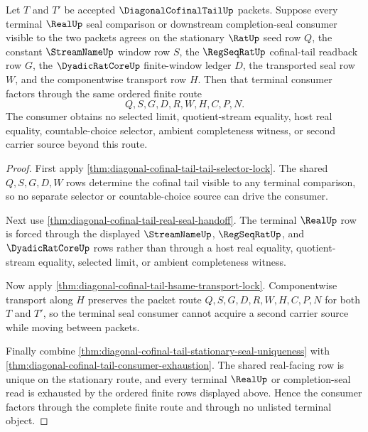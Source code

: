\begin{theorem}
\label{thm:diagonal-cofinal-tail-terminal-seal-factorization}
Let $T$ and $T'$ be accepted $\DiagonalCofinalTailUp$ packets. Suppose every terminal $\RealUp$ seal comparison or downstream completion-seal consumer visible to the two packets agrees on the stationary $\RatUp$ seed row $Q$, the constant $\StreamNameUp$ window row $S$, the $\RegSeqRatUp$ cofinal-tail readback row $G$, the $\DyadicRatCoreUp$ finite-window ledger $D$, the transported seal row $W$, and the componentwise transport row $H$. Then that terminal consumer factors through the same ordered finite route
$$
Q,S,G,D,R,W,H,C,P,N.
$$
The consumer obtains no selected limit, quotient-stream equality, host real equality, countable-choice selector, ambient completeness witness, or second carrier source beyond this route.
\end{theorem}
\begin{proof}
First apply \autoref{thm:diagonal-cofinal-tail-tail-selector-lock}. The shared $Q,S,G,D,W$ rows determine the cofinal tail visible to any terminal comparison, so no separate selector or countable-choice source can drive the consumer.

Next use \autoref{thm:diagonal-cofinal-tail-real-seal-handoff}. The terminal $\RealUp$ row is forced through the displayed $\StreamNameUp$, $\RegSeqRatUp$, and $\DyadicRatCoreUp$ rows rather than through a host real equality, quotient-stream equality, selected limit, or ambient completeness witness.

Now apply \autoref{thm:diagonal-cofinal-tail-hsame-transport-lock}. Componentwise transport along $H$ preserves the packet route $Q,S,G,D,R,W,H,C,P,N$ for both $T$ and $T'$, so the terminal seal consumer cannot acquire a second carrier source while moving between packets.

Finally combine \autoref{thm:diagonal-cofinal-tail-stationary-seal-uniqueness} with \autoref{thm:diagonal-cofinal-tail-consumer-exhaustion}. The shared real-facing row is unique on the stationary route, and every terminal $\RealUp$ or completion-seal read is exhausted by the ordered finite rows displayed above. Hence the consumer factors through the complete finite route and through no unlisted terminal object.
\end{proof}


